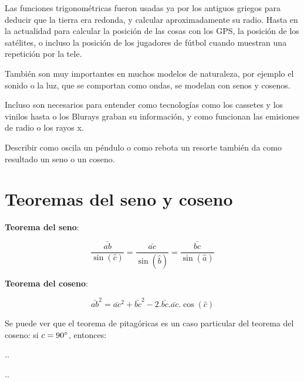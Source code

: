 \documentclass[a4paper,11pt,spanish,sans]{exam}
\begin{document}
Las funciones trigonométricas fueron usadas ya por los antiguos griegos para deducir que la tierra era redonda, y calcular aproximadamente su radio. 
Hasta en la actualidad para calcular la posición de las cosas con los GPS, la posición de los satélites, o incluso la posición de los jugadores de fútbol cuando muestran una repetición por la tele.

También son muy importantes en muchos modelos de naturaleza, por ejemplo el sonido o la luz, que se comportan como ondas, se modelan con senos y cosenos.

Incluso son necesarios para entender como tecnologías como los cassetes y los vinilos hasta o los Blurays graban su información, y como funcionan las emisiones de radio o los rayos x.

Describir como oscila un péndulo o como rebota un resorte también da como resultado un seno o un coseno.

\section*{Teoremas del seno y coseno}

\begin{minipage}{0.45\linewidth}


\end{minipage}
\begin{minipage}{0.5\linewidth}
\textbf{Teorema del seno}:

\[
\frac{\bar{ab}}{\sin(\hat{c})}=\frac{\bar{ac}}{\sin(\hat{b})}=\frac{\bar{bc}}{\sin(\hat{a})}
\]

\textbf{Teorema del coseno}:

\[
\bar{ab}^2=\bar{ac}^2 + \bar{bc}^2 - 2.\bar{bc}.\bar{ac}.\cos(\hat{c})
\]

Se puede ver que el teorema de pitagóricas es un caso particular del teorema del coseno: si  $c=90 \degree$, entonces: 

..

..
\end{minipage}
\end{document}
